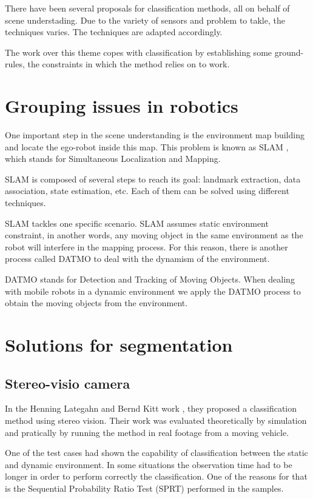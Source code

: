 
There have been several proposals for classification methods, all on behalf of scene understading. Due to the variety of sensors and problem to takle, the techniques varies. The techniques are adapted accordingly.

The work over this theme copes with classification by establishing some ground-rules, the constraints in which the method relies on to work.

\section{Grouping issues in robotics}

One important step in the scene understanding is the environment map building and locate the ego-robot inside this map. This problem is known as SLAM \cite{Leonard2002Mobile}, which stands for Simultaneous Localization and  Mapping.

SLAM is composed of several steps to reach its goal: landmark extraction, data association, state estimation, etc. Each of them can be solved using different techniques.

SLAM tackles one specific scenario. SLAM assumes static environment constraint, in another words, any moving object in the same environment as the robot will interfere in the mapping process. For this reason, there is another process called DATMO to deal with the dynamism of the environment.

DATMO stands for Detection and Tracking of Moving Objects. When dealing with mobile robots in a dynamic environment we apply the DATMO process to obtain the moving objects from the environment.

\section{Solutions for segmentation}

\subsection{Stereo-visio camera}

In the Henning Lategahn and Bernd Kitt work \cite{DBLP:conf/ivs/LategahnGHKE11}, they proposed a classification method using stereo vision. Their work was evaluated theoretically by simulation and pratically by running the method in real footage from a moving vehicle.

One of the test cases had shown the capability of classification between the static and dynamic environment. In some situations the observation time had to be longer in order to perform correctly the classification. One of the reasons for that is the Sequential Probability Ratio Test (SPRT) performed in the samples.

